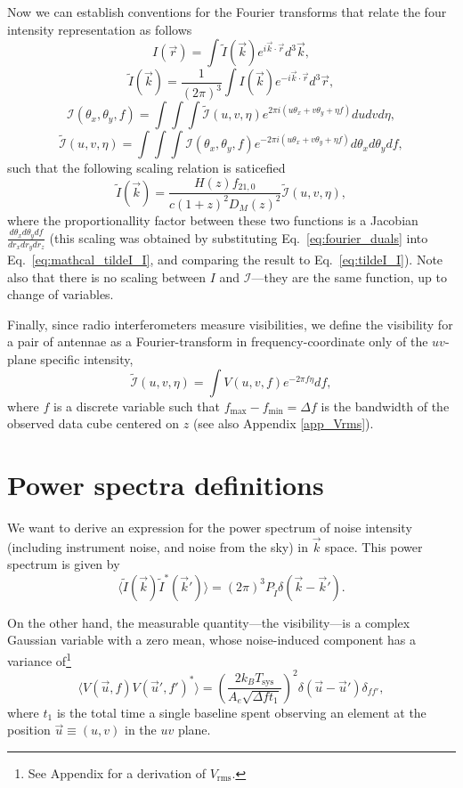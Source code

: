 \documentclass[12pt]{paper}
\newcommand{\beq}{\begin{equation}}
\newcommand{\eeq}{\end{equation}}
\begin{document}
Now we can establish conventions for the Fourier transforms that relate the four intensity representation as follows
\beq
I(\vec{r}) = \int\widetilde{I}(\vec{k})e^{i\vec{k} \cdot \vec{r}}d^3\vec{k},
\label{eq:I_tildeI}
\eeq
\beq
\widetilde{I}(\vec{k}) = \frac{1}{(2\pi)^3}\int{I}(\vec{k})e^{-i\vec{k} \cdot \vec{r}}d^3\vec{r},
\label{eq:tildeI_I}
\eeq
\beq
\mathcal{I}(\theta_x,\theta_y,f) = \int\int\int\widetilde{\mathcal{I}}(u,v,\eta)e^{2\pi i(u\theta_x + v\theta_y+\eta f)}dudvd\eta,
\label{eq:mathcal_I_tildeI}
\eeq
\beq
\widetilde{\mathcal{I}}(u,v,\eta) = \int\int\int{\mathcal{I}}(\theta_x,\theta_y,f)e^{-2\pi i(u\theta_x + v\theta_y+\eta f)}d\theta_xd\theta_ydf,
\label{eq:mathcal_tildeI_I}
\eeq
such that the following scaling relation is saticefied
\begin{equation}
\widetilde{I}(\vec{k}) = \frac{H(z)f_{21,0}}{c(1+z)^2D_M(z)^2}\widetilde{\mathcal{I}}(u,v,\eta),
\label{eq_tilde_I_vs_Ik_scaling}
\end{equation}
where the proportionallity factor between these two functions is a Jacobian $\frac{d\theta_xd\theta_ydf}{dr_xdr_ydr_z}$ (this scaling was obtained by substituting Eq.~\ref{eq:fourier_duals} into Eq.~\ref{eq:mathcal_tildeI_I}, and comparing the result to Eq.~\ref{eq:tildeI_I}). Note also that there is no scaling between $I$ and $\mathcal{I}$---they are the same function, up to change of variables.

Finally, since radio interferometers measure visibilities, we define the visibility for a pair of antennae as a Fourier-transform in frequency-coordinate only of the $uv$-plane specific intensity,
\beq
\mathcal{\widetilde{I}}(u,v,\eta) = \int V(u,v,f)e^{-2\pi f\eta}df,
\label{eq:visibility}
\eeq
where $f$ is a discrete variable such that $f_\text{max}-f_\text{min}=\Delta f$ is the bandwidth of the observed data cube centered on $z$ (see also Appendix \ref{app_Vrms}).
\section{Power spectra definitions}

We want to derive an expression for the power spectrum of noise intensity (including instrument noise, and noise from the sky) in $\vec{k}$ space. This power spectrum is given by
\beq
\langle \widetilde{I}(\vec{k})\widetilde{I}^*(\vec{k}')\rangle = (2\pi)^3P_{\widetilde{I}}\delta(\vec{k}-\vec{k}').
\label{eq_tildeI_power}
\eeq

On the other hand, the measurable quantity---the visibility---is a complex Gaussian variable with a zero mean, whose noise-induced component has a variance of\footnote{See Appendix for a derivation of $V_\text{rms}$.}
\beq
\langle V(\vec{u},f)V(\vec{u}',f')^*\rangle = \left(\frac{2k_BT_\text{sys}}{A_e\sqrt{\Delta f t_1}}\right)^2 \delta(\vec{u}-\vec{u}')\delta_{ff'},
\label{eq_Vrms}
\eeq
where $t_1$ is the total time a single baseline spent observing an element at the position $\vec u \equiv(u,v)$ in the $uv$ plane. 
\end{document}
